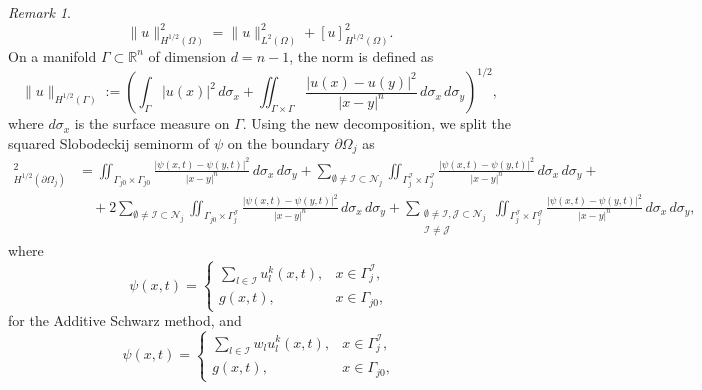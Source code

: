 \documentclass[a4paper, 11pt]{article}
\theoremstyle{remark}
\newtheorem{remark}[equation]{Remark}
\begin{document}
\begin{remark}
    \begin{equation*}
         \lVert u\rVert_{H^{1/2}(\Omega)}^{2} = \lVert u\rVert^{2}_{L^{2}(\Omega)} + [u]^{2}_{H^{1/2}(\Omega)}.
    \end{equation*}
    On a manifold $\Gamma\subset\mathbb{R}^{n}$ of dimension $d = n-1$, the norm is defined as
    \begin{equation*}
         \lVert u\rVert_{H^{1/2}(\Gamma)} := \left(\int_{\Gamma}|u(x)|^{2}\,d\sigma_x + \iint_{\Gamma\times \Gamma}\dfrac{|u(x) - u(y)|^{2}}{|x-y|^{n}} \, d\sigma_x\,d\sigma_y\right)^{1/2},
    \end{equation*}
    where $d\sigma_x$ is the surface measure on $\Gamma$. Using the new decomposition, we split the squared Slobodeckij seminorm of $\psi$ on the boundary $\partial\Omega_{j}$ as
    \begin{align*}
         [\psi]_{H^{1/2}(\partial\Omega_j)}^2 &= \iint_{\Gamma_{j0} \times \Gamma_{j0}} \frac{|\psi(x, t)-\psi(y, t)|^2}{|x-y|^n} \, d\sigma_x \, d\sigma_y + \sum_{\emptyset\neq\mathcal{I}\subset\mathcal{N}_{j}} \iint_{\Gamma_j^{\mathcal{I}} \times \Gamma_j^{\mathcal{I}}} \frac{|\psi(x, t)-\psi(y, t)|^2}{|x-y|^n} \, d\sigma_x \, d\sigma_y + \\
         &\quad + 2\sum_{\emptyset\neq\mathcal{I}\subset\mathcal{N}_{j}} \iint_{\Gamma_{j0} \times \Gamma_j^{\mathcal{I}}} \frac{|\psi(x, t)-\psi(y, t)|^2}{|x-y|^n} \, d\sigma_x \, d\sigma_y + \sum_{\substack{\emptyset \neq \mathcal{I}, \mathcal{J} \subset \mathcal{N}_{j} \\ \mathcal{I} \neq \mathcal{J}}} \iint_{\Gamma_j^{\mathcal{I}} \times \Gamma_j^{\mathcal{J}}} \frac{|\psi(x, t)-\psi(y, t)|^2}{|x-y|^n} \, d\sigma_x \, d\sigma_y,
    \end{align*}
    where
    \begin{equation*}
        \psi(x, t) = 
        \begin{cases}
            \sum_{l\in\mathcal{I}}u_{l}^{k}(x, t), & x\in \Gamma_{j}^{\mathcal{I}},\\
            g(x, t), & x\in \Gamma_{j0},
        \end{cases}
    \end{equation*}
    for the Additive Schwarz method, and
    \begin{equation*}
        \psi(x, t) = 
        \begin{cases}
            \sum_{l\in\mathcal{I}}w_{l}u_{l}^{k}(x, t), & x\in \Gamma_{j}^{\mathcal{I}},\\
            g(x, t), & x\in \Gamma_{j0},

\end{cases}
\end{equation*}
\end{remark}
\end{document}
